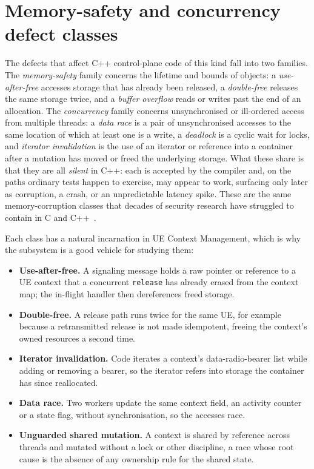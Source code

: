 \documentclass[english,twoside,openright,a4paper,censored,csm,software-track-2020]{HYthesisML}
\begin{document}
\section{Memory-safety and concurrency defect classes}
The defects that affect C++ control-plane code of this kind fall into two families. The
\emph{memory-safety} family concerns the lifetime and bounds of objects: a \emph{use-after-free}
accesses storage that has already been released, a \emph{double-free} releases the same storage
twice, and a \emph{buffer overflow} reads or writes past the end of an allocation. The
\emph{concurrency} family concerns unsynchronised or ill-ordered access from multiple threads: a
\emph{data race} is a pair of unsynchronised accesses to the same location of which at least one
is a write, a \emph{deadlock} is a cyclic wait for locks, and \emph{iterator invalidation} is
the use of an iterator or reference into a container after a mutation has moved or freed the
underlying storage. What these share is that they are all \emph{silent} in C++: each is accepted
by the compiler and, on the paths ordinary tests happen to exercise, may appear to work,
surfacing only later as corruption, a crash, or an unpredictable latency spike. These are the
same memory-corruption classes that decades of security research have struggled to contain in C
and C++~\cite{szekeres2013sok}.

Each class has a natural incarnation in UE Context Management, which is why the subsystem is a
good vehicle for studying them:

\begin{itemize}
  \item \textbf{Use-after-free.} A signaling message holds a raw pointer or reference to a UE
        context that a concurrent \texttt{release} has already erased from the context map; the
        in-flight handler then dereferences freed storage.
  \item \textbf{Double-free.} A release path runs twice for the same UE, for example because a
        retransmitted release is not made idempotent, freeing the context's owned resources a
        second time.
  \item \textbf{Iterator invalidation.} Code iterates a context's data-radio-bearer list while
        adding or removing a bearer, so the iterator refers into storage the container has since
        reallocated.
  \item \textbf{Data race.} Two workers update the same context field, an activity counter or a
        state flag, without synchronisation, so the accesses race.
  \item \textbf{Unguarded shared mutation.} A context is shared by reference across threads and
        mutated without a lock or other discipline, a race whose root cause is the absence of any
        ownership rule for the shared state.
\end{itemize}
\end{document}
